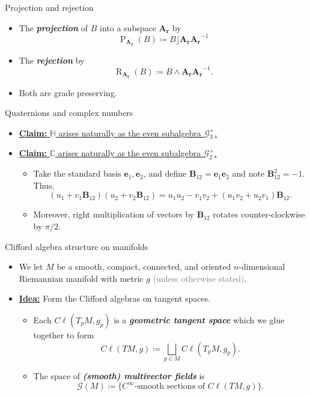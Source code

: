 \documentclass[aspectratio=169,handout]{beamer}
\newcommand\boldgreen[1]{\textcolor{lighter_csu_green}{\emph{\textbf{#1}}}}
\newcommand{\C}{\mathbb{C}}
\newcommand{\G}{\mathcal{G}}
\newcommand{\projection}{\operatorname{P}}
\newcommand{\rejection}{\operatorname{R}}
\newcommand{\blade}[1]{\boldsymbol{#1}}
\newcommand{\bivector}{\blade{B}}
\begin{document}
\begin{frame}{Projection and rejection}
\vfill
\begin{itemize}
\pause
\item The \boldgreen{projection} of $B$ into a subspace $\blade{A_r}$ by
\[
\projection_{\blade{A_r}} (B) \coloneqq B\rfloor \blade{A_r}\blade{A_r}^{-1}
\]
\pause
\item The \boldgreen{rejection} by
\[
\rejection_{\blade{A_r}} (B) \coloneqq B\wedge \blade{A_r}\blade{A_r}^{-1}.
\]
\pause
\item Both are grade preserving.
\end{itemize}
\vfill
\end{frame}

\begin{frame}{Quaternions and complex numbers}
\vfill
\begin{itemize}
\pause
\item \underline{\textbf{Claim:} $\mathbb{H}$ arises naturally as the even subalgebra $\G_3^+$.}

\pause
\item \underline{\textbf{Claim:} $\C$ arises naturally as the even subalgebra $\G_2^+$.}\\
\begin{itemize}
\pause
\item Take the standard basis $\blade{e}_1,\blade{e}_2$, and define $\bivector_{12}= \blade{e}_1\blade{e}_2$ and note $\bivector_{12}^2 = -1$. Thus,
\[
(u_1+v_1 \bivector_{12})(u_2 + v_2 \bivector_{12}) = u_1u_2-v_1 v_2 + (u_1 v_2+u_2v_1)\bivector_{12}.
\]
\pause
\item Moreover, right multiplication of vectors by $\bivector_{12}$ rotates counter-clockwise by $\pi/2$.
\end{itemize}
\end{itemize}
\vfill
\end{frame}

\begin{frame}{Clifford algebra structure on manifolds}
\vfill
\begin{itemize}
\item We let $M$ be a smooth, compact, connected, and oriented $n$-dimensional Riemannian manifold with metric $g$ \textcolor{gray}{(unless otherwise stated)}.

\item \noindent\textbf{\underline{Idea:}} Form the Clifford algebras on tangent spaces.
    \begin{itemize}
        \pause
        \item Each $C\ell(T_pM,g_p)$ is a \boldgreen{geometric tangent space} which we glue together to form
        \[
        C\ell(TM,g) \coloneqq \bigsqcup_{p\in M} C\ell(T_pM,g_p).
        \]
        \pause
        \item The space of \boldgreen{(smooth) multivector fields} is
        \[
        \G(M) \coloneqq \{\textrm{$C^\infty$-smooth sections of $C\ell(TM,g)$}\}.
        \]
    \end{itemize}

\end{itemize}
\vfill
\end{frame}
\end{document}
